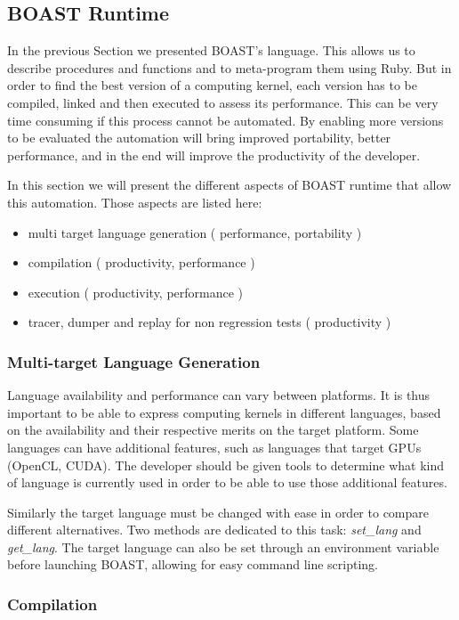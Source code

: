 \documentclass[11pt, a4paper, twoside]{montblanc}
\begin{document}
\subsection{BOAST Runtime}

In the previous Section we presented BOAST's language. This allows us to
describe procedures and functions and to meta-program them using Ruby. But in
order to find the best version of a computing kernel, each version has to be
compiled, linked and then executed to assess its performance. This can be very
time consuming if this process cannot be automated. By enabling more versions to
be evaluated the automation will bring improved portability, better performance,
and in the end will improve the productivity of the developer.

In this section we will present the different aspects of BOAST runtime that
allow this automation. Those aspects are listed here:
  \begin{itemize}
  \item multi target language generation ( performance, portability )
  \item compilation ( productivity, performance )
  \item execution ( productivity, performance )
  \item tracer, dumper and replay for non regression tests ( productivity )
  \end{itemize}

  \subsubsection{Multi-target Language Generation}
\label{sec:multitarget}
Language availability and performance can vary between platforms. It is thus
important to be able to express computing kernels in different languages, based
on the availability and their respective merits on the target platform. Some
languages can have additional features, such as languages that target GPUs
(OpenCL, CUDA). The developer should be given tools to determine what kind of
language is currently used in order to be able to use those additional features.

Similarly the target language must be changed with ease in order to compare
different alternatives. Two methods are dedicated to this task: \emph{set\_lang}
and \emph{get\_lang}. The target language can also be set through an environment
variable before launching BOAST, allowing for easy command line scripting.

  \subsubsection{Compilation}
\end{document}
